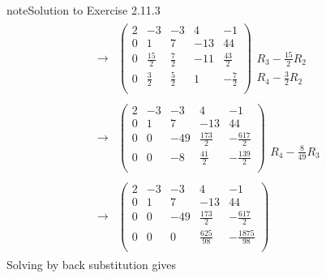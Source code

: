 \documentclass[letterpaper,10pt,english]{jupyterBook}
\begin{document}
\begin{sphinxadmonition}{note}{Solution to Exercise 2.11.3}
\begin{equation*}
\begin{split}
\begin{align*}
    \longrightarrow 
    & \left( \begin{array}{cccc|c} 
         2 & -3 & -3 & 4 & -1 \\ 
         0 & 1 & 7 & -13 & 44 \\ 
         0 & \frac{15}{2} & \frac{7}{2} & -11 & \frac{43}{2} \\ 
         0 & \frac{3}{2} & \frac{5}{2} & 1 & - \frac{7}{2} \\ 
    \end{array} \right) 
    \begin{array}{l} \phantom{x} \\ \phantom{x} \\ R_{3} - \frac{15}{2} R_{2} \\ R_{4} - \frac{3}{2} R_{2} \end{array} \\ \\ 
    \longrightarrow 
    & \left( \begin{array}{cccc|c} 
         2 & -3 & -3 & 4 & -1 \\ 
         0 & 1 & 7 & -13 & 44 \\ 
         0 & 0 & -49 & \frac{173}{2} & - \frac{617}{2} \\ 
         0 & 0 & -8 & \frac{41}{2} & - \frac{139}{2} \\ 
    \end{array} \right) 
    \begin{array}{l} \phantom{x} \\ \phantom{x} \\ \phantom{x} \\ R_{4} - \frac{8}{49} R_{3} \end{array} \\ \\ 
    \longrightarrow 
    & \left( \begin{array}{cccc|c} 
         2 & -3 & -3 & 4 & -1 \\ 
         0 & 1 & 7 & -13 & 44 \\ 
         0 & 0 & -49 & \frac{173}{2} & - \frac{617}{2} \\ 
         0 & 0 & 0 & \frac{625}{98} & - \frac{1875}{98} \\ 
    \end{array} \right) 
\end{align*} \end{split}
\end{equation*}
\sphinxAtStartPar
Solving by back substitution gives
\begin{equation*}

\end{equation*}
\end{sphinxadmonition}
\end{document}
